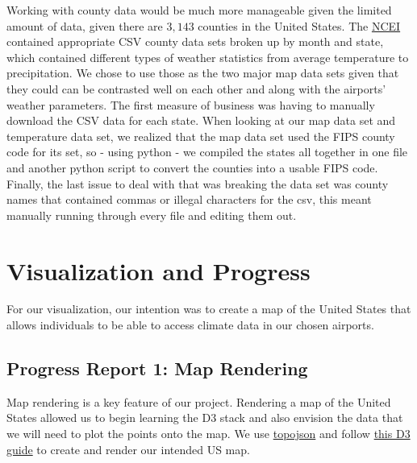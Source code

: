 \documentclass[9pt,twocolumn,twoside]{opticajnl}
\begin{document}
Working with county data would be much more manageable given the limited amount of data, given there are $3,143$ counties in the United States. The \href{https://www.ncei.noaa.gov/access/monitoring/climate-at-a-glance/county/mapping}{NCEI} contained appropriate CSV county data sets broken up by month and state, which contained different types of weather statistics from average temperature to precipitation. We chose to use those as the two major map data sets given that they could can be contrasted well on each other and along with the airports' weather parameters. The first measure of business was having to manually download the CSV data for each state. When looking at our map data set and temperature data set, we realized that the map data set used the FIPS county code for its set, so - using python - we compiled the states all together in one file and another python script to convert the counties into a usable FIPS code. Finally, the last issue to deal with that was breaking the data set was county names that contained commas or illegal characters for the csv, this meant manually running through every file and editing them out.

\section {Visualization and Progress}

For our visualization, our intention was to create a map of the United States that allows individuals to be able to access climate data in our chosen airports. 

\subsection{Progress Report 1: Map Rendering}

Map rendering is a key feature of our project. Rendering a map of the United States allowed us to begin learning the D3 stack and also envision the data that we will need to plot the points onto the map. We use \href{https://github.com/topojson/topojson}{topojson} and follow \href{https://observablehq.com/@d3/u-s-map}{this D3 guide} to create and render our intended US map.
\end{document}
